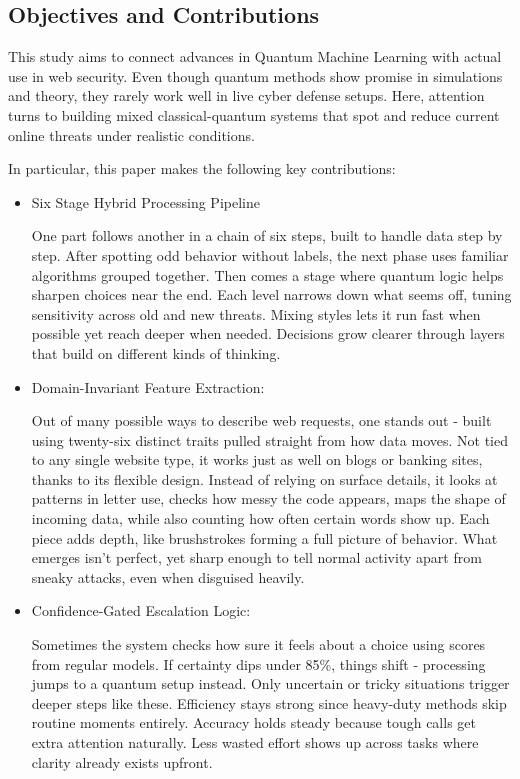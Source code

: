 \documentclass[journal,onecolumn]{IEEEtran}
\begin{document}
\subsection{Objectives and Contributions}
This study aims to connect advances in Quantum Machine Learning with actual use in web security. Even though quantum methods show promise in simulations and theory, they rarely work well in live cyber defense setups. Here, attention turns to building mixed classical-quantum systems that spot and reduce current online threats under realistic conditions.

In particular, this paper makes the following key contributions:
\begin{itemize}

\item Six Stage Hybrid Processing Pipeline

One part follows another in a chain of six steps, built to handle data step by step. After spotting odd behavior without labels, the next phase uses familiar algorithms grouped together. Then comes a stage where quantum logic helps sharpen choices near the end. Each level narrows down what seems off, tuning sensitivity across old and new threats. Mixing styles lets it run fast when possible yet reach deeper when needed. Decisions grow clearer through layers that build on different kinds of thinking.

\item Domain-Invariant Feature Extraction:

Out of many possible ways to describe web requests, one stands out - built using twenty-six distinct traits pulled straight from how data moves. Not tied to any single website type, it works just as well on blogs or banking sites, thanks to its flexible design. Instead of relying on surface details, it looks at patterns in letter use, checks how messy the code appears, maps the shape of incoming data, while also counting how often certain words show up. Each piece adds depth, like brushstrokes forming a full picture of behavior. What emerges isn't perfect, yet sharp enough to tell normal activity apart from sneaky attacks, even when disguised heavily.

\item Confidence-Gated Escalation Logic:

Sometimes the system checks how sure it feels about a choice using scores from regular models. If certainty dips under 85\%, things shift - processing jumps to a quantum setup instead. Only uncertain or tricky situations trigger deeper steps like these. Efficiency stays strong since heavy-duty methods skip routine moments entirely. Accuracy holds steady because tough calls get extra attention naturally. Less wasted effort shows up across tasks where clarity already exists upfront.


\end{itemize}
\end{document}
